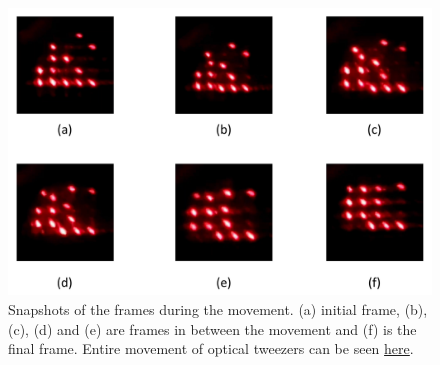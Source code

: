 \vspace{0.8cm}
\begin{figure}[H]
\label{frames}
\centering
\includegraphics[width=\textwidth]{img/frame.png}
\caption{Snapshots of the frames during the movement. (a) initial frame, (b), (c), (d) and (e) are frames in between the movement and (f) is the final frame. Entire movement of optical tweezers can be seen \href{https://drive.google.com/file/d/10Ov5Z4IybwpwF9MXvInDwmm_61tb9SZ2/view?usp=sharing}{here}.}
\end{figure}


